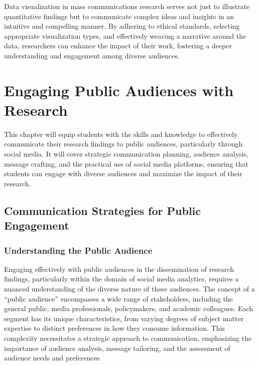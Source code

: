 \documentclass[
]{book}
\begin{document}
Data visualization in mass communications research serves not just to illustrate quantitative findings but to communicate complex ideas and insights in an intuitive and compelling manner. By adhering to ethical standards, selecting appropriate visualization types, and effectively weaving a narrative around the data, researchers can enhance the impact of their work, fostering a deeper understanding and engagement among diverse audiences.

\hypertarget{engaging-public-audiences-with-research}{%
\chapter{Engaging Public Audiences with Research}\label{engaging-public-audiences-with-research}}

This chapter will equip students with the skills and knowledge to effectively communicate their research findings to public audiences, particularly through social media. It will cover strategic communication planning, audience analysis, message crafting, and the practical use of social media platforms, ensuring that students can engage with diverse audiences and maximize the impact of their research.

\hypertarget{communication-strategies-for-public-engagement}{%
\section{Communication Strategies for Public Engagement}\label{communication-strategies-for-public-engagement}}

\hypertarget{understanding-the-public-audience}{%
\subsection*{Understanding the Public Audience}\label{understanding-the-public-audience}}

Engaging effectively with public audiences in the dissemination of research findings, particularly within the domain of social media analytics, requires a nuanced understanding of the diverse nature of these audiences. The concept of a ``public audience'' encompasses a wide range of stakeholders, including the general public, media professionals, policymakers, and academic colleagues. Each segment has its unique characteristics, from varying degrees of subject matter expertise to distinct preferences in how they consume information. This complexity necessitates a strategic approach to communication, emphasizing the importance of audience analysis, message tailoring, and the assessment of audience needs and preferences.
\end{document}
